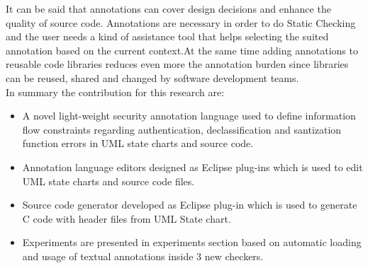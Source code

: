 It can be said that annotations can cover design decisions and enhance the quality of source code. Annotations are necessary in order to do Static Checking and the user needs a kind of assistance tool that helps selecting the suited annotation based on the current context.At the same time adding annotations to reusable code libraries reduces even more the annotation burden since libraries can be reused, shared and changed by software development teams.\\

In summary the contribution for this research are:
\begin{itemize}
 \item A novel light-weight security annotation language
	used to define information flow constraints regarding authentication, declassification and santization function errors  in UML state charts and source code.
	
\item Annotation language editors designed as Eclipse
	plug-ins which is used to edit UML state charts and
	source code files.
	
\item Source code generator developed as Eclipse plug-in which is used to generate C code with header files from UML State chart.
	
\item Experiments are presented in experiments section based on
	automatic loading and usage of textual annotations
	inside 3 new checkers.
	
\end{itemize}

 


